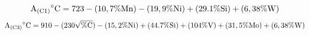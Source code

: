 \begin{equation}
    \label{eq:A_C1}
    \mathrm{A\textsubscript{(C1)}}^{\circ}\mathrm{C} = 723 - (10,7\%\mathrm{Mn}) - (19,9\%\mathrm{Ni}) + (29.1\%\mathrm{Si}) + (6,38\%\mathrm{W})
\end{equation}
\begin{equation}
    \label{eq:A_C3}
    \mathrm{A\textsubscript{(C3)}}^{\circ}\mathrm{C} = 910 - (230\sqrt{\%\mathrm{C}}) - (15,2\%\mathrm{Ni}) + (44.7\%\mathrm{Si}) + (104\%\mathrm{V}) + (31,5\%\mathrm{Mo}) + (6,38\%\mathrm{W})
\end{equation}

